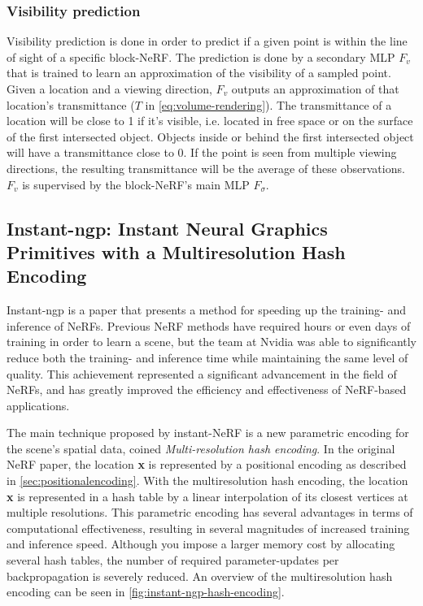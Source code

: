 \subsubsection{Visibility prediction} \label{sec:visibility-prediction}
Visibility prediction is done in order to predict if a given point is within the line of sight of a specific block-NeRF. The prediction is done by a secondary MLP $F_v$ that is trained to learn an approximation of the visibility of a sampled point. Given a location and a viewing direction, $F_v$ outputs an approximation of that location's transmittance ($T$ in \autoref{eq:volume-rendering}). The transmittance of a location will be close to 1 if it's visible, i.e. located in free space or on the surface of the first intersected object. Objects inside or behind the first intersected object will have a transmittance close to 0. If the point is seen from multiple viewing directions, the resulting transmittance will be the average of these observations. $F_v$ is supervised by the block-NeRF's main MLP $F_\sigma$.



\subsection{Instant-ngp: Instant Neural Graphics Primitives with a Multiresolution Hash Encoding} \label{sec:instant-ngp}
Instant-ngp \cite{muller_instant_2022} is a paper that presents a method for speeding up the training- and inference of NeRFs. Previous NeRF methods have required hours or even days of training in order to learn a scene, but the team at Nvidia was able to significantly reduce both the training- and inference time while maintaining the same level of quality. This achievement represented a significant advancement in the field of NeRFs, and has greatly improved the efficiency and effectiveness of NeRF-based applications.

The main technique proposed by instant-NeRF is a new parametric encoding for the scene's spatial data, coined \textit{Multi-resolution hash encoding}. In the original NeRF paper, the location \textbf{x} is represented by a positional encoding as described in \autoref{sec:positionalencoding}. With the multiresolution hash encoding, the location \textbf{x} is represented in a hash table by a linear interpolation of its closest vertices at multiple resolutions. This parametric encoding has several advantages in terms of computational effectiveness, resulting in several magnitudes of increased training and inference speed. Although you impose a larger memory cost by allocating several hash tables, the number of required parameter-updates per backpropagation is severely reduced. An overview of the multiresolution hash encoding can be seen in \autoref{fig:instant-ngp-hash-encoding}.

